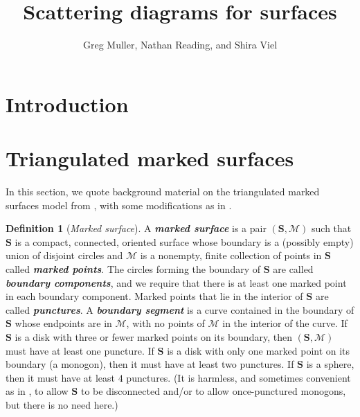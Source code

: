 \documentclass{amsart}
\title{Scattering diagrams for surfaces}
\author{Greg Muller, Nathan Reading, and Shira Viel}
\theoremstyle{definition}
\newtheorem{definition}[proposition]{Definition}
\theoremstyle{remark}
\numberwithin{equation}{section}
\newcommand{\margincolor}{red}
\newcommand{\marginauthorcolor}{darkgreen}
\newcounter{margincounter}
\newcommand{\marginnum}{
\ifnum\value{margincounter}<10
\textcolor{\margincolor}{\begin{picture}(0,0)\put(2.2,2.4){\circle{9}}\end{picture}\footnotesize\arabic{margincounter}}
\else\ifnum\value{margincounter}<100
\textcolor{\margincolor}{\begin{picture}(0,0)\put(4.256,2.5){\circle{11}}\end{picture}\footnotesize\arabic{margincounter}}
\else
\textcolor{\margincolor}{\begin{picture}(0,0)\put(6.8,2.5){\circle{14}}\end{picture}\footnotesize\arabic{margincounter}}
\fi\fi
}
\newcommand{\margin}[2][]
{\!\!\refstepcounter{margincounter}\marginnum\marginpar{\textcolor{\margincolor}{\arabic{margincounter}.}\,\,\tiny #2\,\,\,\textcolor{\marginauthorcolor}{\small#1}}}
\newcommand{\marginN}[1]{\margin[NR]{#1}}
\newcommand{\newword}[1]{\textbf{\emph{#1}}}
\newcommand{\0}{{\mathbf{0}}}
\newcommand{\M}{\mathcal{M}}
\renewcommand{\S}{\mathbf{S}}
\begin{document}
%
%
%

\section{Introduction}\label{intro sec}  




\section{Triangulated marked surfaces}\label{surface sec}
In this section, we quote background material on the triangulated marked surfaces model from \cite{cats1,cats2}, with some modifications as in \cite{unisurface}.


\begin{definition}[\emph{Marked surface}]\label{S M def}
A \newword{marked surface} is a pair $(\S,\M)$ such that $\S$ is a compact, connected, oriented surface whose boundary is a (possibly empty) union of disjoint circles and $\M$ is a nonempty, finite collection of points in $\S$ called \newword{marked points}.
The circles forming the boundary of $\S$ are called \newword{boundary components}, and we require that there is at least one marked point in each boundary component.
Marked points that lie in the interior of $\S$ are called \newword{punctures}.
A \newword{boundary segment} is a curve contained in the boundary of $\S$ whose endpoints are in $\M$, with no points of $\M$ in the interior of the curve.
If $\S$ is a disk with three or fewer marked points on its boundary, then $(\S,\M)$ must have at least one puncture.
If $\S$ is a disk with only one marked point on its boundary (a monogon), then it must have at least two punctures.
If $\S$ is a sphere, then it must have at least $4$ punctures.  
(It is harmless, and sometimes convenient as in \cite{dominance}, to allow $\S$ to be disconnected and/or to allow once-punctured monogons, but there is no need here.)
\end{definition}
\end{document}
